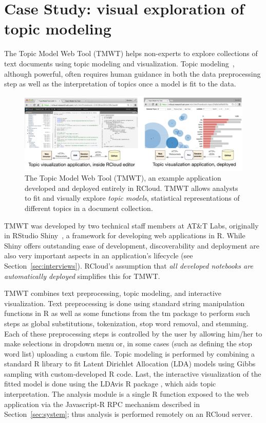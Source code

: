 \section{Case Study\label{sec:casestudy}: visual exploration of topic modeling}

The Topic Model Web Tool (TMWT) helps non-experts to explore collections of
text documents using topic modeling and
visualization. Topic modeling~\cite{Blei:2003:LDA},
although powerful, often requires human guidance in both the 
data preprocessing step as well as the
interpretation of topics once a model is fit to the data.

\begin{figure}
  \includegraphics[width=\linewidth]{fig/casestudytext/casestudytext.pdf}
  \caption{\label{fig:textvis}The Topic Model Web Tool (TMWT), an example application developed
    and deployed entirely in RCloud.  TMWT allows analysts to
    fit and visually explore \emph{topic models}, statistical
    representations of different topics in a document collection.
  }
\end{figure}

TMWT was developed by two technical staff members at
AT\&T Labs, originally in RStudio Shiny~\cite{RStudio:2013:SWA},
a framework for developing web applications in R.
While Shiny offers outstanding ease of development,
discoverability and deployment are also very important aspects
in an application's lifecycle (see Section~\ref{sec:interviews}).
RCloud's assumption that \emph{all developed notebooks are automatically
deployed} simplifies this for TMWT.

TMWT combines text preprocessing, topic modeling, and
interactive visualization. Text preprocessing is done
using standard string manipulation functions in R as well as
some functions from the tm package \cite{R:tm} to perform
such steps as global substitutions, tokenization, stop word removal, 
and stemming. Each of these preprocessing steps is controlled by the user
by allowing him/her to make selections in dropdown menu or, in 
some cases (such as defining the stop word list) uploading 
a custom file. Topic modeling is performed by
combining a standard R library to fit Latent Dirichlet 
Allocation (LDA) models using
Gibbs sampling with custom-developed R code. Last, the interactive
visualization of the fitted model is done using the LDAvis R package
\cite{R:LDAvis}, which aids topic interpretation.
The analysis module is a single R function
exposed to the web application via the Javascript-R RPC
mechanism described in Section~\ref{sec:system};
thus analysis is performed remotely on an RCloud server.

